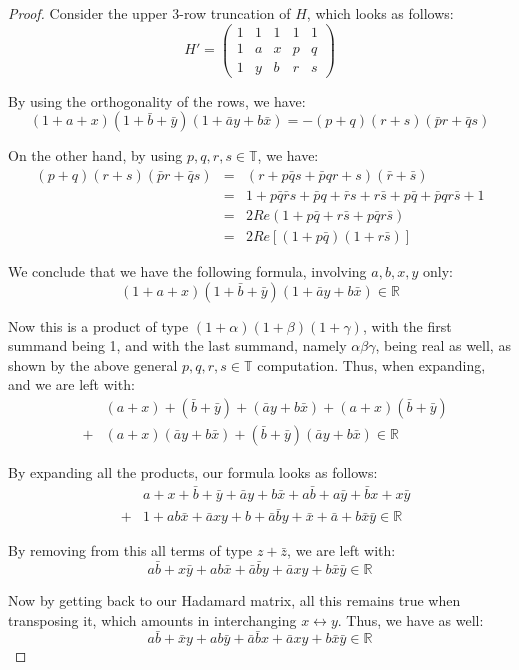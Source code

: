 \documentclass[12pt]{amsbook}
\begin{document}
\begin{proof}
Consider the upper 3-row truncation of $H$, which looks as follows:
$$H'=\begin{pmatrix}
1&1&1&1&1\\
1&a&x&p&q\\
1&y&b&r&s
\end{pmatrix}$$

By using the orthogonality of the rows, we have:
$$(1+a+x)(1+\bar{b}+\bar{y})(1+\bar{a}y+b\bar{x})
=-(p+q)(r+s)(\bar{p}r+\bar{q}s)$$

On the other hand, by using $p,q,r,s\in\mathbb T$, we have:
\begin{eqnarray*}
(p+q)(r+s)(\bar{p}r+\bar{q}s)
&=&(r+p\bar{q}s+\bar{p}qr+s)(\bar{r}+\bar{s})\\
&=&1+p\bar{q}\bar{r}s+\bar{p}q+\bar{r}s+r\bar{s}+p\bar{q}+\bar{p}qr\bar{s}+1\\
&=&2Re(1+p\bar{q}+r\bar{s}+p\bar{q}r\bar{s})\\
&=&2Re[(1+p\bar{q})(1+r\bar{s})]
\end{eqnarray*}

We conclude that we have the following formula, involving $a,b,x,y$ only:
$$(1+a+x)(1+\bar{b}+\bar{y})(1+\bar{a}y+b\bar{x})\in\mathbb R$$

Now this is a product of type $(1+\alpha)(1+\beta)(1+\gamma)$, with the first summand being 1, and with the last summand, namely $\alpha\beta\gamma$, being real as well, as shown by the above general $p,q,r,s\in\mathbb T$ computation. Thus, when expanding, and we are left with:
\begin{eqnarray*}
&&(a+x)+(\bar{b}+\bar{y})+(\bar{a}y+b\bar{x})+(a+x)(\bar{b}+\bar{y})\\
&+&(a+x)(\bar{a}y+b\bar{x})+(\bar{b}+\bar{y})(\bar{a}y+b\bar{x})\in\mathbb R
\end{eqnarray*}

By expanding all the products, our formula looks as follows:
\begin{eqnarray*}
&&a+x+\bar{b}+\bar{y}+\bar{a}y+b\bar{x}+a\bar{b}+a\bar{y}+\bar{b}x+x\bar{y}\\
&+&1+ab\bar{x}+\bar{a}xy+b+\bar{a}\bar{b}y+\bar{x}+\bar{a}+b\bar{x}\bar{y}\in\mathbb R
\end{eqnarray*}

By removing from this all terms of type $z+\bar{z}$, we are left with:
$$a\bar{b}+x\bar{y}+ab\bar{x}+\bar{a}\bar{b}y+\bar{a}xy+b\bar{x}\bar{y}\in\mathbb R$$

Now by getting back to our Hadamard matrix, all this remains true when transposing it, which amounts in interchanging $x\leftrightarrow y$. Thus, we have as well:
$$a\bar{b}+\bar{x}y+ab\bar{y}+\bar{a}\bar{b}x+\bar{a}xy+b\bar{x}\bar{y}\in\mathbb R$$


\end{proof}
\end{document}
